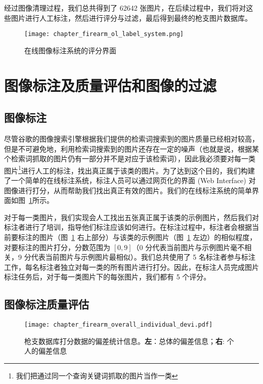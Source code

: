 经过图像清理过程，我们总共得到了 62642 张图片，在后续过程中，我们将对这些图片进行人工标注，然后进行评分与过滤，最后得到最终的枪支图片数据库。
\begin{figure}[t]
	\centering
	\texttt{[image: chapter\_firearm\_ol\_label\_system.png]}
	\caption{在线图像标注系统的评分界面}
	\label{fig:online_label_system}
\end{figure}

\section{图像标注及质量评估和图像的过滤}\label{sec:image_label_filtering}

\subsection{图像标注}
尽管谷歌的图像搜索引擎根据我们提供的检索词搜索到的图片质量已经相对较高，但是不可避免地，利用检索词搜索到的图片还存在一定的噪声（也就是说，根据某个检索词抓取的图片仍有一部分并不是对应于该检索词），因此我必须要对每一类图片\footnote{我们把通过同一个查询关键词抓取的图片当作一类}进行人工的标注，找出真正属于该类的图片。为了达到这个目的，我们构建了一个简单的在线标注系统，标注人员可以通过网页化的界面 (Web Interface) 对图像进行打分，从而帮助我们找出真正有效的图片。我们的在线标注系统的简单界面如图~\ref{fig:online_label_system}所示。


对于每一类图片，我们实现会人工找出五张真正属于该类的示例图片，然后我们对标注者进行了培训，指导他们标注应该如何进行。在标注过程中，标注者会根据当前要标注的图片（图~\ref{fig:online_label_system} 右上部分）与该类的示例图片（图~\ref{fig:online_label_system} 左边）的相似程度，对要标注的图片打分，分数范围为 $[0,9]$（0 分代表当前图片与示例图片毫不相关，9 分代表当前图片与示例图片最相似）。我们总共使用了 5 名标注者参与标注工作，每名标注者独立对每一类的所有图片进行打分。因此，在标注人员完成图片标注任务后，对于每一类图片下的每张图片，我们都有 5 个评分。

\subsection{图像标注质量评估}

\begin{figure}[t]
	\centering
	\texttt{[image: chapter\_firearm\_overall\_individual\_devi.pdf]}
	\caption[枪支数据库打分数据的偏差统计信息]{枪支数据库打分数据的偏差统计信息。\textbf{左}：总体的偏差信息；\textbf{右}: 个人的偏差信息}
	\label{fig:deviation_info}
\end{figure}

